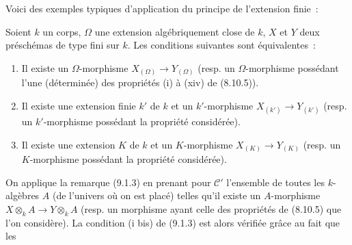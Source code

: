 Voici des exemples typiques d'application du principe de l'extension finie~:

\begin{proposition}[9.1.4]
\label{IV.9.1.4-fr}
Soient $k$ un corps, $\Omega$ une extension algébriquement close de $k$,
$X$ et $Y$ deux préschémas de type fini sur $k$. Les conditions suivantes
sont équivalentes~:
\begin{enumerate}[label=\emph{\alph*)}]
  \item Il existe un $\Omega$-morphisme $X_{(\Omega)}\to Y_{(\Omega)}$
  (resp. un $\Omega$-morphisme possédant l'une (déterminée) des propriétés
  (i) à (xiv) de (8.10.5)).
  \item Il existe une extension finie $k'$ de $k$ et un $k'$-morphisme
  $X_{(k')}\to Y_{(k')}$ (resp. un $k'$-morphisme possédant la propriété
  considérée).
  \item Il existe une extension $K$ de $k$ et un $K$-morphisme
  $X_{(K)}\to Y_{(K)}$ (resp. un $K$-morphisme possédant la propriété
  considérée).
\end{enumerate}
\end{proposition}

On applique la remarque (9.1.3) en prenant pour $\mathcal C'$ l'ensemble de
toutes les $k$-algèbres $A$ (de l'univers où on est placé) telles qu'il existe
un $A$-morphisme $X\otimes_k A\to Y\otimes_k A$ (resp. un morphisme ayant
celle des propriétés de (8.10.5) que l'on considère). La condition (i bis) de
(9.1.3) est alors vérifiée grâce au fait que les

